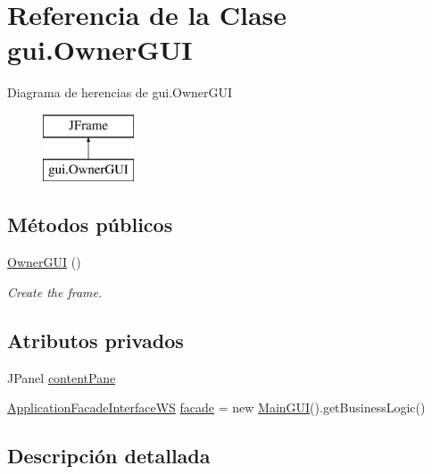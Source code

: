\hypertarget{classgui_1_1_owner_g_u_i}{}\section{Referencia de la Clase gui.\+Owner\+G\+UI}
\label{classgui_1_1_owner_g_u_i}
Diagrama de herencias de gui.\+Owner\+G\+UI\begin{figure}[H]
\begin{center}
\leavevmode
\includegraphics[height=2.000000cm]{classgui_1_1_owner_g_u_i}
\end{center}
\end{figure}
\subsection*{Métodos públicos}
\begin{DoxyCompactItemize}
\item 
\mbox{\hyperlink{classgui_1_1_owner_g_u_i_ae4efc071e5f519db154b9fc128239e89}{Owner\+G\+UI}} ()
\begin{DoxyCompactList}\small\item\em Create the frame. \end{DoxyCompactList}\end{DoxyCompactItemize}
\subsection*{Atributos privados}
\begin{DoxyCompactItemize}
\item 
J\+Panel \mbox{\hyperlink{classgui_1_1_owner_g_u_i_a1e284b6506332a7360b4d3b706de3404}{content\+Pane}}
\item 
\mbox{\hyperlink{interfacebusiness_logic_1_1_application_facade_interface_w_s}{Application\+Facade\+Interface\+WS}} \mbox{\hyperlink{classgui_1_1_owner_g_u_i_adc21b31ee1addb912b73455e4e78d130}{facade}} = new \mbox{\hyperlink{classgui_1_1_main_g_u_i}{Main\+G\+UI}}().get\+Business\+Logic()
\end{DoxyCompactItemize}


\subsection{Descripción detallada}


